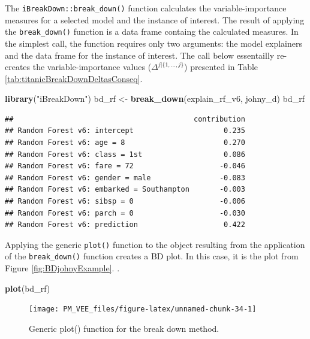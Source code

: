 \documentclass[12pt,]{krantz}
\newenvironment{Shaded}{\begin{snugshade}}{\end{snugshade}}
\newcommand{\KeywordTok}[1]{\textcolor[rgb]{0.13,0.29,0.53}{\textbf{#1}}}
\newcommand{\NormalTok}[1]{#1}
\newcommand{\StringTok}[1]{\textcolor[rgb]{0.31,0.60,0.02}{#1}}
\begin{document}
The \texttt{iBreakDown::break\_down()} function calculates the variable-importance measures for a selected model and the instance of interest. The result of applying the \texttt{break\_down()} function is a data frame containg the calculated measures. In the simplest call, the function requires only two arguments: the model explainers and the data frame for the instance of interest. The call below essentailly re-creates the variable-importance values (\(\Delta^{j|\{1,\ldots,j\}}\)) presented in Table \ref{tab:titanicBreakDownDeltasConseq}.

\begin{Shaded}
\begin{Highlighting}[]
\KeywordTok{library}\NormalTok{(}\StringTok{"iBreakDown"}\NormalTok{)}
\NormalTok{bd_rf <-}\StringTok{ }\KeywordTok{break_down}\NormalTok{(explain_rf_v6, johny_d)}
\NormalTok{bd_rf}
\end{Highlighting}
\end{Shaded}

\begin{verbatim}
##                                          contribution
## Random Forest v6: intercept                     0.235
## Random Forest v6: age = 8                       0.270
## Random Forest v6: class = 1st                   0.086
## Random Forest v6: fare = 72                    -0.046
## Random Forest v6: gender = male                -0.083
## Random Forest v6: embarked = Southampton       -0.003
## Random Forest v6: sibsp = 0                    -0.006
## Random Forest v6: parch = 0                    -0.030
## Random Forest v6: prediction                    0.422
\end{verbatim}

Applying the generic \texttt{plot()} function to the object resulting from the application of the \texttt{break\_down()} function creates a BD plot. In this case, it is the plot from Figure \ref{fig:BDjohnyExample}.
.

\begin{Shaded}
\begin{Highlighting}[]
\KeywordTok{plot}\NormalTok{(bd_rf) }
\end{Highlighting}
\end{Shaded}

\begin{figure}

{\centering \texttt{[image: PM\_VEE\_files/figure-latex/unnamed-chunk-34-1]} 

}

\caption{Generic plot() function for the break down method.}\label{fig:unnamed-chunk-34}
\end{figure}
\end{document}
